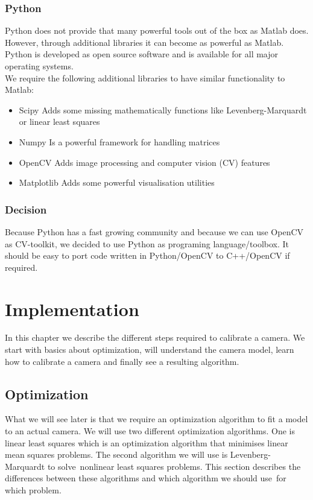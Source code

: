 \documentclass[11pt,a4paper,titlepage,oneside]{report}
\begin{document}
\subsection{Python}
Python does not provide that many powerful tools out of the box as Matlab does. However, through additional libraries it can become as powerful as Matlab. Python is developed as open source software and is available for all major operating systems.\\
We require the following additional libraries to have similar functionality to Matlab:
\begin{itemize}
  \item Scipy
    \subitem Adds some missing mathematically functions like Levenberg-Marquardt or linear least squares
  \item Numpy
    \subitem Is a powerful framework for handling matrices
  \item OpenCV
		\subitem Adds image processing and computer vision (CV) features
  \item Matplotlib
    \subitem Adds some powerful visualisation utilities
\end{itemize}

\subsection{Decision}
Because Python has a fast growing community and because we can use OpenCV as CV-toolkit, we decided to use Python as programing language/toolbox. It should be easy to port code written in Python/OpenCV to C++/OpenCV if required.

\chapter{Implementation}\label{chap:implementation}

In this chapter we describe the different steps required to calibrate a camera. We start with basics about optimization, will understand the camera model, learn how to calibrate a camera and finally see a resulting algorithm.

\section{Optimization}
What we will see later is that we require an optimization algorithm to fit a model to an actual camera. We will use two different optimization algorithms. One is linear least squares which is an optimization algorithm that minimises linear mean squares problems. The second algorithm we will use is Levenberg-Marquardt to solve nonlinear least squares problems. This section describes the differences between these algorithms and which algorithm we should use for which problem.
\end{document}
